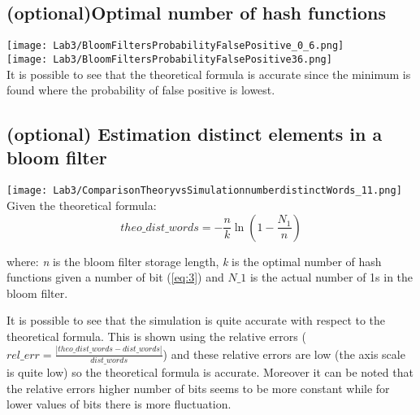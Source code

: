 \documentclass[twocolumn,letterpaper]{report}
\begin{document}
{				\subsection{(optional)Optimal number of hash functions}
				\texttt{[image: Lab3/BloomFiltersProbabilityFalsePositive\_0\_6.png]} \\
						\texttt{[image: Lab3/BloomFiltersProbabilityFalsePositive36.png]} \\
				It is possible to see that the theoretical formula is accurate since the minimum is found where the probability of false positive is lowest.
				
				
				\subsection{(optional) Estimation distinct elements in a bloom filter}
				\texttt{[image: Lab3/ComparisonTheoryvsSimulationnumberdistinctWords\_11.png]} \\
				Given the theoretical formula: 
				\[ theo\_dist\_words = - \frac{n}{k} \ln \left( 1 - \frac{N_1}{n} \right) \]
				\begin{center}
				where: \emph{n} is the bloom filter storage length, \emph{k} is the optimal number of hash functions given a number of bit  (\ref{eq:3}) and $N\_1$ is the actual number of 1s in the bloom filter. 
				\end{center}
				It is possible to see that the simulation is quite accurate with respect to the theoretical formula. This is shown using the relative errors ($ rel\_err=\frac{|theo\_dist\_words-dist\_words|}{dist\_words} $) and these relative errors are low (the axis scale is quite low) so the theoretical formula is accurate. Moreover it can be noted that the relative errors higher number of bits seems to be more constant while for lower values of bits there is more fluctuation.
				
} \fi
\end{document}
